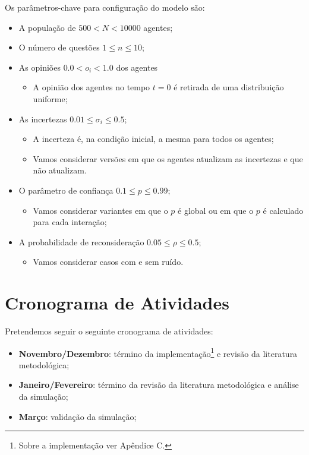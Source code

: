 Os parâmetros-chave para configuração do modelo são:
\begin{itemize}
\item A população de \(500 < N < 10000\) agentes;
\item O número de questões \(1 \leq n \leq 10\); 
\item As opiniões \(0.0< o_i< 1.0\) dos agentes
  \begin{itemize}
  \item A opinião dos agentes no tempo \(t = 0\) é retirada de uma distribuição
    uniforme;
  \end{itemize}
\item As incertezas \(0.01 \leq \sigma_i \leq 0.5\);
  \begin{itemize}
  \item A incerteza é, na condição inicial, a mesma para todos os agentes;
  \item Vamos considerar versões em que os agentes atualizam as incertezas e que
    não atualizam.
  \end{itemize}

\item O parâmetro de confiança \(0.1 \leq p \leq 0.99\);
  \begin{itemize}
  \item Vamos considerar variantes em que o \(p\) é global ou em que o \(p\) é
    calculado para cada interação;
  \end{itemize}
  
\item A probabilidade de reconsideração \(0.05 \leq \rho  \leq 0.5\);
  \begin{itemize}
  \item Vamos considerar casos com e sem ruído.
  \end{itemize}
\end{itemize}


\section{Cronograma de Atividades}

Pretendemos seguir o seguinte cronograma de atividades:
\begin{itemize}
\item \textbf{Novembro/Dezembro}: término da implementação\footnote{Sobre a
    implementação ver Apêndice C.} e revisão da literatura metodológica;
\item \textbf{Janeiro/Fevereiro}: término da revisão da literatura metodológica
  e análise da simulação;
\item \textbf{Março}: validação da simulação;
\end{itemize}





















